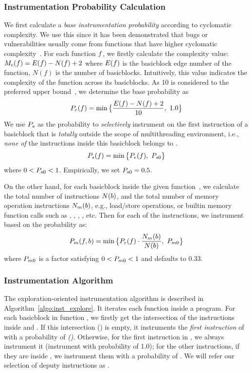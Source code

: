 \subsubsection{Instrumentation Probability Calculation}
We first calculate a \emph{base instrumentation probability} according to cyclomatic complexity. We use this since it has been demonstrated that bugs or vulnerabilities usually come from functions that have higher cyclomatic complexity~\cite{macabecc,vul_metric,fuzz_vul_metric}. For each function $f$, we firstly calculate the complexity value: $M_c(f) = E(f) - N(f) + 2$ where $E(f)$ is the basicblock edge number of the function, $N(f)$ is the number of basicblocks. Intuitively, this value indicates the complexity of the function across its basicblocks. As 10 is considered to the preferred upper bound~\cite{macabecc}, we determine the base probability as
{\myeqsize\begin{equation}
    P_e(f) = \min\big\{\frac{E(f)-N(f)+2}{10}, ~1.0\big\}
\end{equation}}
We use ${P_s}$ as the probability to \emph{selectively} instrument on the first instruction of a basicblock that is \emph{totally} outside the scope of multithreading environment, i.e., \emph{none of} the instructions inside this basicblock belongs to \mtiscope.
{\myeqsize\begin{equation}
    {\ensuremath{P_s(f)}} = \min\big\{P_e(f), ~{P_{s0}}\big\}
\end{equation}}
where $0<{P_{s0}}<1$. Empirically, we set ${P_{s0}}=0.5$.

On the other hand, for each basicblock \aBB inside the given function~\aFUNC, we calculate the total number of instructions $N(b)$, and the total number of memory operation instructions  $N_m(b)$, e.g., load/store operations, or builtin memory function calls such as , , , , etc. 
Then for each of the instructions, we instrument based on the probability as:
{\myeqsize\begin{equation}
    {\ensuremath{P_m(f, b)}} = \min\big\{P_e(f)\cdot\frac{N_m(b)}{N(b)}, ~{P_{m0}} \big\}\end{equation}}
where ${P_{m0}}$ is a factor satisfying $0<{P_{m0}}<1$ and defaults to $0.33$.

\subsubsection{Instrumentation Algorithm}
The exploration-oriented instrumentation algorithm is described in Algorithm~\ref{algo:inst_explore}. It iterates each function inside a program. For each basicblock \aBB in function \aFUNC, we firstly get the intersection of the instructions inside \aBB and \mtiscope. If this intersection \mtiscope(\aBB) is empty, it instruments the \emph{first instruction} of \aBB with a probability of \emph{\stpn(\aFUNC)}. Otherwise, for the first instruction in \aBB, we always instrument it (instrument with probability of 1.0); for the other instructions, if they are inside \mtiscope, we instrument them with a probability of \mtp{\aFUNC}{\aBB}. We will refer our selection of deputy instructions as \MTIns.

